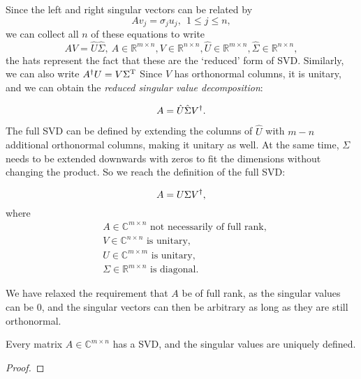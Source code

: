 \documentclass{article}
\begin{document}
Since the left and right singular vectors can be related by
\begin{equation}
Av_j=\sigma_ju_j,\ \ 1\leq j\leq n,
\end{equation}
we can collect all $n$ of these equations to write
\begin{equation}
AV=\hat{U}\hat{\Sigma},\ A\in\mathbb{R}^{m\times n},V\in\mathbb{R}^{n\times n},\hat{U}\in\mathbb{R}^{m\times n},\hat{\Sigma}\in\mathbb{R}^{n\times n},
\end{equation}
the hats represent the fact that these are the `reduced' form of SVD. Similarly, we can also write $A^{\dagger} U=V\Sigma^{\text{T}}$ Since $V$ has orthonormal columns, it is unitary, and we can obtain the \textit{reduced singular value decomposition}:
\begin{definition}
\label{def:reduced-svd}
\begin{equation}
    A=\hat{U}\hat{\Sigma}V^{\dagger}.
\end{equation}
\end{definition}

The full SVD can be defined by extending the columns of $\hat{U}$ with $m-n$ additional orthonormal columns, making it unitary as well. At the same time, $\Sigma$ needs to be extended downwards with zeros to fit the dimensions without changing the product. So we reach the definition of the full SVD:
\begin{definition}
\begin{equation}
\label{eq:full-svd}
    A=U\Sigma V^{\dagger},
\end{equation}
where 
\begin{align*}
    &A\in\mathbb{C}^{m\times n}\text{ not necessarily of full rank},\\
    &V\in\mathbb{C}^{n\times n}\text{ is unitary},\\
    &U\in\mathbb{C}^{m\times m}\text{ is unitary},\\
    &\Sigma\in\mathbb{R}^{m\times n}\text{ is diagonal}.
\end{align*}
\end{definition}
We have relaxed the requirement that $A$ be of full rank, as the singular values can be $0$, and the singular vectors can then be arbitrary as long as they are still orthonormal.
\begin{theorem}
    Every matrix $A\in\mathbb{C}^{m\times n}$ has a SVD, and the singular values are uniquely defined.
\end{theorem}
\begin{proof}
    
\end{proof}
\end{document}
